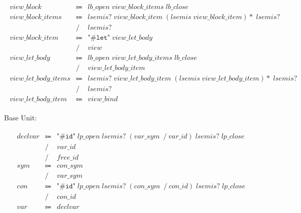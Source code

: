 \begin{align*}
    \begin{array}{rcll}
        \mathit{view\_block}
        &\Coloneq &\mathit{lb\_open}\; \mathit{view\_block\_items}\; \mathit{lb\_close} \\
        \mathit{view\_block\_items}
        &\Coloneq &\mathit{lsemis}{?}\; \mathit{view\_block\_item}\; (\mathit{lsemis}\; \mathit{view\_block\_item}){*}\; \mathit{lsemis}{?} \\
        &\mathrel{/} &\mathit{lsemis}{?} \\
        \mathit{view\_block\_item}
        &\Coloneq &\texttt{"\#let"}\; \mathit{view\_let\_body} \\
        &\mathrel{/} &\mathit{view} \\
        \mathit{view\_let\_body}
        &\Coloneq &\mathit{lb\_open}\; \mathit{view\_let\_body\_items}\; \mathit{lb\_close} \\
        &\mathrel{/} &\mathit{view\_let\_body\_item} \\
        \mathit{view\_let\_body\_items}
        &\Coloneq &\mathit{lsemis}{?}\; \mathit{view\_let\_body\_item}\; (\mathit{lsemis}\; \mathit{view\_let\_body\_item}){*}\; \mathit{lsemis}{?} \\
        &\mathrel{/} &\mathit{lsemis}{?} \\
        \mathit{view\_let\_body\_item}
        &\Coloneq &\mathit{view\_bind}
    \end{array}
\end{align*}

Base Unit:

\begin{align*}
    \begin{array}{rcll}
        \mathit{declvar}
        &\Coloneq &\texttt{"\#id"}\; \mathit{lp\_open}\; \mathit{lsemis}{?}\; (\mathit{var\_sym}\; \mathrel{/} \mathit{var\_id})\; \mathit{lsemis}{?}\; \mathit{lp\_close} \\
        &\mathrel{/} &\mathit{var\_id} \\
        &\mathrel{/} &\mathit{free\_id} \\
        \mathit{sym}
        &\Coloneq &\mathit{con\_sym} \\
        &\mathrel{/} &\mathit{var\_sym} \\
        \mathit{con}
        &\Coloneq &\texttt{"\#id"}\; \mathit{lp\_open}\; \mathit{lsemis}{?}\; (\mathit{con\_sym}\; \mathrel{/} \mathit{con\_id})\; \mathit{lsemis}{?}\; \mathit{lp\_close} \\
        &\mathrel{/} &\mathit{con\_id} \\
        \mathit{var}
        &\Coloneq &\mathit{declvar}
    \end{array}
\end{align*}

